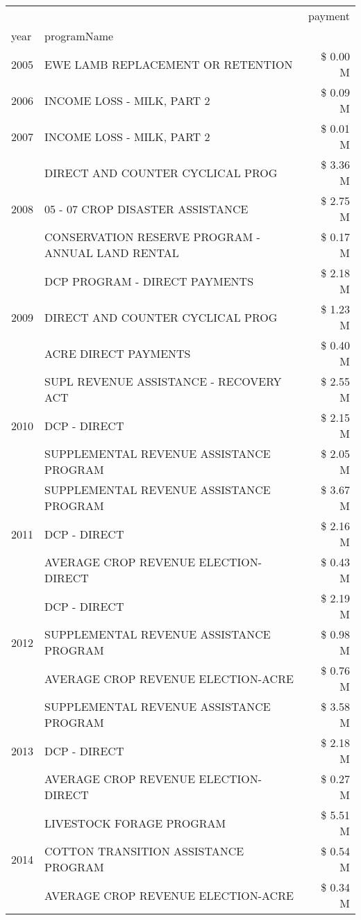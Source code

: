 \begin{tabular}{llr}
\toprule
 &  & payment \\
year & programName &  \\
\midrule
2005 & EWE LAMB REPLACEMENT OR RETENTION & \$ 0.00 M \\
\cline{1-3}
2006 & INCOME LOSS - MILK, PART 2 & \$ 0.09 M \\
\cline{1-3}
2007 & INCOME LOSS - MILK, PART 2 & \$ 0.01 M \\
\cline{1-3}
\multirow[t]{3}{*}{2008} & DIRECT AND COUNTER CYCLICAL PROG & \$ 3.36 M \\
 & 05 - 07 CROP DISASTER ASSISTANCE & \$ 2.75 M \\
 & CONSERVATION RESERVE PROGRAM - ANNUAL LAND RENTAL & \$ 0.17 M \\
\cline{1-3}
\multirow[t]{3}{*}{2009} & DCP PROGRAM - DIRECT PAYMENTS & \$ 2.18 M \\
 & DIRECT AND COUNTER CYCLICAL PROG & \$ 1.23 M \\
 & ACRE DIRECT PAYMENTS & \$ 0.40 M \\
\cline{1-3}
\multirow[t]{3}{*}{2010} & SUPL REVENUE ASSISTANCE - RECOVERY ACT & \$ 2.55 M \\
 & DCP - DIRECT & \$ 2.15 M \\
 & SUPPLEMENTAL REVENUE ASSISTANCE PROGRAM & \$ 2.05 M \\
\cline{1-3}
\multirow[t]{3}{*}{2011} & SUPPLEMENTAL REVENUE ASSISTANCE PROGRAM & \$ 3.67 M \\
 & DCP - DIRECT & \$ 2.16 M \\
 & AVERAGE CROP REVENUE ELECTION-DIRECT & \$ 0.43 M \\
\cline{1-3}
\multirow[t]{3}{*}{2012} & DCP - DIRECT & \$ 2.19 M \\
 & SUPPLEMENTAL REVENUE ASSISTANCE PROGRAM & \$ 0.98 M \\
 & AVERAGE CROP REVENUE ELECTION-ACRE & \$ 0.76 M \\
\cline{1-3}
\multirow[t]{3}{*}{2013} & SUPPLEMENTAL REVENUE ASSISTANCE PROGRAM & \$ 3.58 M \\
 & DCP - DIRECT & \$ 2.18 M \\
 & AVERAGE CROP REVENUE ELECTION-DIRECT & \$ 0.27 M \\
\cline{1-3}
\multirow[t]{3}{*}{2014} & LIVESTOCK FORAGE PROGRAM & \$ 5.51 M \\
 & COTTON TRANSITION ASSISTANCE PROGRAM & \$ 0.54 M \\
 & AVERAGE CROP REVENUE ELECTION-ACRE & \$ 0.34 M \\

\end{tabular}
